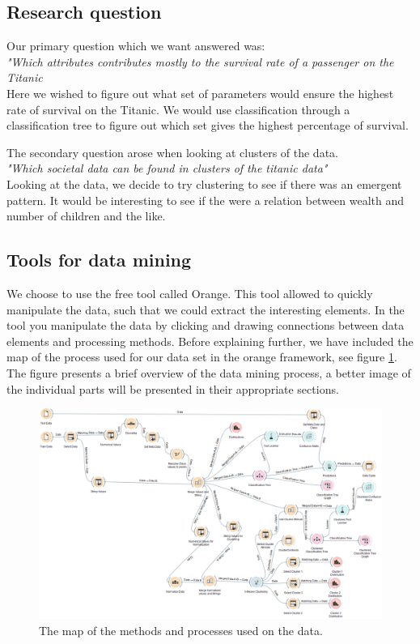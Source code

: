 \documentclass[a4paper,11pt]{article}
\begin{document}
\subsection{Research question}
Our primary question which we want answered was:\\
\textit{"Which attributes contributes mostly to the survival rate of a passenger on the Titanic}\\
Here we wished to figure out what set of parameters would ensure the highest rate of survival on the Titanic. We would use classification through a classification tree to figure out which set gives the highest percentage of survival.

The secondary question arose when looking at clusters of the data.\\
\textit{"Which societal data can be found in clusters of the titanic data"}\\
Looking at the data, we decide to try clustering to see if there was an emergent pattern. It would be interesting to see if the were a relation between wealth and number of children and the like. 
\subsection{Tools for data mining}
We choose to use the free tool called Orange\cite{orange}. This tool allowed to quickly manipulate the data, such that we could extract the interesting elements. 
In the tool you manipulate the data by clicking and drawing connections between data elements and processing methods. Before explaining further, we have included the map of the process used for our data set in the orange framework, see figure \ref{OrangeMap}. The figure presents a brief overview of the data mining process, a better image of the individual parts will be presented in their appropriate sections. 
\begin{figure}[h]
	\centering
	\includegraphics[scale=0.35]{orangeMap}
	\caption{The map of the methods and processes used on the data.}
	\label{OrangeMap}
\end{figure}
\end{document}
